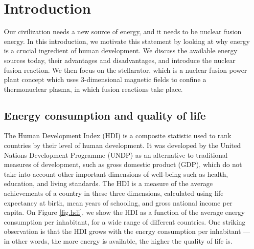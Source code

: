 \documentclass[my_thesis.tex]{subfiles}
\begin{document}
\cleardoublepage
\chapter{Introduction}
 

Our civilization needs a new source of energy, and it needs to be nuclear fusion energy. In this introduction, we motivate this statement by looking at why energy is a crucial ingredient of human development. We discuss the available energy sources today, their advantages and disadvantages, and introduce the nuclear fusion reaction. We then focus on the stellarator, which is a nuclear fusion power plant concept which uses 3-dimensional magnetic fields to confine a thermonuclear plasma, in which fusion reactions take place.

\section{Energy consumption and quality of life}

The Human Development Index (HDI)  \citep{undp1990} is a composite statistic used to rank countries by their level of human development. It was developed by the United Nations Development Programme (UNDP) as an alternative to traditional measures of development, such as gross domestic product (GDP), which do not take into account other important dimensions of well-being such as health, education, and living standards. The HDI is a measure of the average achievements of a country in these three dimensions, calculated using life expectancy at birth, mean years of schooling, and gross national income per capita. On Figure \ref{fig.hdi}, we show the HDI as a function of the average energy consumption per inhabitant, for a wide range of different countries. One striking observation is that the HDI grows with the energy consumption per inhabitant --- in other words, the more energy is available, the higher the quality of life is.
\end{document}
